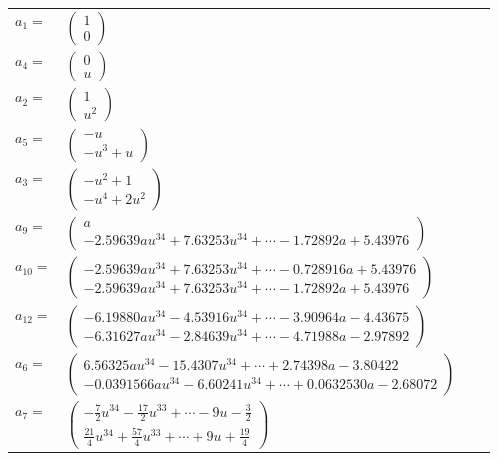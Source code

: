 \documentclass[1p]{elsarticle_modified}
\theoremstyle{definition}
\begin{document}
\begin{tabular}{m{7pt} m{180pt} m{7pt} m{180pt} }
\flushright $a_{1}=$&$\begin{pmatrix}1\\0\end{pmatrix}$ \\
\flushright $a_{4}=$&$\begin{pmatrix}0\\u\end{pmatrix}$ \\
\flushright $a_{2}=$&$\begin{pmatrix}1\\u^2\end{pmatrix}$ \\
\flushright $a_{5}=$&$\begin{pmatrix}- u\\- u^3+u\end{pmatrix}$ \\
\flushright $a_{3}=$&$\begin{pmatrix}- u^2+1\\- u^4+2 u^2\end{pmatrix}$ \\
\flushright $a_{9}=$&$\begin{pmatrix}a\\-2.59639 a u^{34}+7.63253 u^{34}+\cdots-1.72892 a+5.43976\end{pmatrix}$ \\
\flushright $a_{10}=$&$\begin{pmatrix}-2.59639 a u^{34}+7.63253 u^{34}+\cdots-0.728916 a+5.43976\\-2.59639 a u^{34}+7.63253 u^{34}+\cdots-1.72892 a+5.43976\end{pmatrix}$ \\
\flushright $a_{12}=$&$\begin{pmatrix}-6.19880 a u^{34}-4.53916 u^{34}+\cdots-3.90964 a-4.43675\\-6.31627 a u^{34}-2.84639 u^{34}+\cdots-4.71988 a-2.97892\end{pmatrix}$ \\
\flushright $a_{6}=$&$\begin{pmatrix}6.56325 a u^{34}-15.4307 u^{34}+\cdots+2.74398 a-3.80422\\-0.0391566 a u^{34}-6.60241 u^{34}+\cdots+0.0632530 a-2.68072\end{pmatrix}$ \\
\flushright $a_{7}=$&$\begin{pmatrix}-\frac{7}{2} u^{34}-\frac{17}{2} u^{33}+\cdots-9 u-\frac{3}{2}\\\frac{21}{4} u^{34}+\frac{57}{4} u^{33}+\cdots+9 u+\frac{19}{4}\end{pmatrix}$ \\

\end{tabular}
\end{document}
